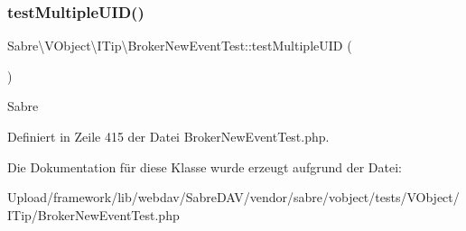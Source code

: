 \subsubsection{\texorpdfstring{test\+Multiple\+U\+I\+D()}{testMultipleUID()}}
{\footnotesize\ttfamily Sabre\textbackslash{}\+V\+Object\textbackslash{}\+I\+Tip\textbackslash{}\+Broker\+New\+Event\+Test\+::test\+Multiple\+U\+ID (\begin{DoxyParamCaption}{ }\end{DoxyParamCaption})}

Sabre 

Definiert in Zeile 415 der Datei Broker\+New\+Event\+Test.\+php.



Die Dokumentation für diese Klasse wurde erzeugt aufgrund der Datei\+:\begin{DoxyCompactItemize}
\item 
Upload/framework/lib/webdav/\+Sabre\+D\+A\+V/vendor/sabre/vobject/tests/\+V\+Object/\+I\+Tip/Broker\+New\+Event\+Test.\+php\end{DoxyCompactItemize}
